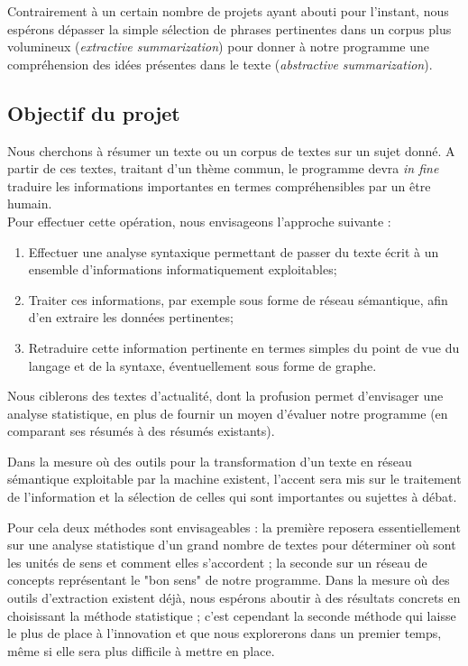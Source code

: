 \documentclass{article}           %
\begin{document}
Contrairement à un certain nombre de projets ayant abouti pour l'instant, nous espérons dépasser la simple sélection de phrases pertinentes dans un corpus plus volumineux (\textit{extractive summarization}) pour donner à notre programme une compréhension des idées présentes dans le texte (\textit{abstractive summarization}).

\subsection{Objectif du projet}
Nous cherchons à résumer un texte ou un corpus de textes sur un sujet donné. A partir de ces textes, traitant d'un thème commun, le programme devra \textit{in fine} traduire les informations importantes en termes compréhensibles par un être humain.\\

Pour effectuer cette opération, nous envisageons l'approche suivante :\\
\begin{enumerate}
 \item Effectuer une analyse syntaxique permettant de passer du texte écrit à un ensemble d'informations informatiquement exploitables;
 \item Traiter ces informations, par exemple sous forme de réseau sémantique, afin d'en extraire les données pertinentes;
 \item Retraduire cette information pertinente en termes simples du point de vue du langage et de la syntaxe, éventuellement sous forme de graphe.
\end{enumerate}

Nous ciblerons des textes d'actualité, dont la profusion permet d'envisager une analyse statistique, en plus de fournir un moyen d'évaluer notre programme (en comparant ses résumés à des résumés existants).

Dans la mesure où des outils pour la transformation d'un texte en réseau sémantique exploitable par la machine existent, l'accent sera mis sur le traitement de l'information et la sélection de celles qui sont importantes ou sujettes à débat.

Pour cela deux méthodes sont envisageables : la première reposera essentiellement sur une analyse statistique d'un grand nombre de textes pour déterminer où sont les unités de sens et comment elles s'accordent ; la seconde sur un réseau de concepts représentant le "bon sens" de notre programme. Dans la mesure où des outils d'extraction existent déjà, nous espérons aboutir à des résultats concrets en choisissant la méthode statistique ; c'est cependant la seconde méthode qui laisse le plus de place à l'innovation et que nous explorerons dans un premier temps, m\^{e}me si elle sera plus difficile à mettre en place. 
\end{document}
